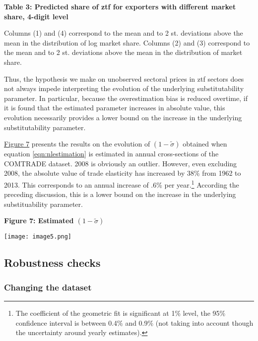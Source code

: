 \documentclass[12pt,twoside,a4paper,notitlepage]{article}
\begin{document}
{ 

\textbf{Table 3: Predicted share of ztf for exporters with different market share, 4-digit level \label{ref-006}}






Columns (1) and (4) correspond to the mean and to 2 st. deviations above the mean in the distribution of log market share. Columns (2) and (3) correspond to the mean and to 2 st. deviations above the mean in the distribution of market share. 

Thus, the hypothesis we make on unobserved sectoral prices in ztf sectors does not always impede interpreting the evolution of the underlying substitutability parameter. In particular, because the overestimation bias is reduced overtime, if it is found that the estimated parameter increases in absolute value, this evolution necessarily provides a lower bound on the increase in the underlying substitutability parameter.

{\hyperref[ref-007]{Figure 7}} presents the results on the evolution of $(1-\tilde{\sigma })$ obtained when equation \ref{eqn:nlestimation} is estimated in annual cross-sections of the COMTRADE dataset. 2008 is obviously an outlier. However, even excluding 2008, the absolute value of trade elasticity has increased by 38\% from 1962 to 2013. This corresponds to an annual increase of .6\% per year.\footnote{The coefficient of the geometric fit is significant at 1\% level, the 95\% confidence interval is between 0.4\% and 0.9\% (not taking into account though the uncertainty around yearly estimates).
}
According the preceding discussion, this is a lower bound on the increase in the underlying substituability parameter. 

\textbf{Figure 7: Estimated $(1-\tilde{\sigma })$ }

\texttt{[image: image5.png]} 

\subsection{Robustness checks\label{mark-2.3.}}

\subsubsection{Changing the dataset\label{mark-2.3.1.}}


}
\end{document}
